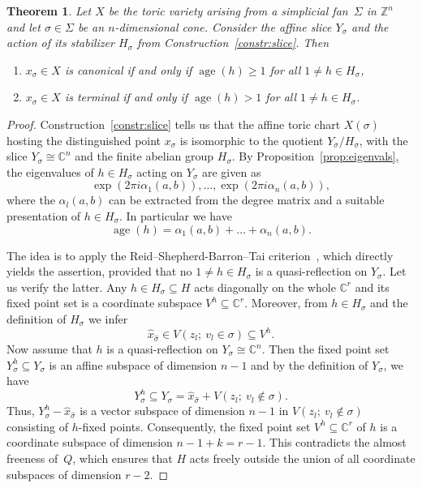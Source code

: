 \documentclass{amsart}
\newcommand{\C}{\mathbb{C}}
\newcommand{\Z}{\mathbb{Z}}
\DeclareMathOperator{\age}{age}
\theoremstyle{plain}
\newtheorem{theorem}{Theorem}[section]
\theoremstyle{definition}
\begin{document}
\begin{theorem}\label{thm:main}
Let $X$ be the toric variety arising from a simplicial fan~$\Sigma$
in $\Z^n$ and let $\sigma \in \Sigma$ be an $n$-dimensional cone.
Consider the affine slice $Y_\sigma$ and the action of its stabilizer
$H_\sigma$ from Construction~\ref{constr:slice}. Then
\begin{enumerate}
\item
$x_\sigma \in X$ is canonical if and only if $\age(h) \ge 1$ for all $1 \ne h \in H_\sigma$,
\item
$x_\sigma \in X$ is terminal if and only if $\age(h) > 1$ for all $1 \ne h \in H_\sigma$.
\end{enumerate}
\end{theorem}

\begin{proof}
Construction~\ref{constr:slice} tells us that the affine toric
chart $X(\sigma)$ hosting the distinguished point $x_\sigma$
is isomorphic to the quotient $Y_\sigma/H_\sigma$, with the slice
$Y_\sigma \cong \C^n$ and the finite abelian group $H_\sigma$.
By Proposition~\ref{prop:eigenvals}, the eigenvalues of $h \in H_\sigma$
acting on $Y_\sigma$ are given as
\[
\exp(2\pi i\alpha_1(a,b)),\dots,\exp(2\pi i\alpha_n(a,b)),
\]
where the $\alpha_l(a,b)$ can be extracted from the degree matrix
and a suitable presentation of $h \in H_\sigma$.
In particular we have
$$
\age(h)=\alpha_1(a,b)+\dots+\alpha_n(a,b).
$$

The idea is to apply the Reid--Shepherd-Barron--Tai criterion~\cite{MS84},
which directly yields the assertion, provided that no
$1\neq h \in H_\sigma$ is a quasi-reflection on $Y_\sigma$.
Let us verify the latter.
Any $h \in H_\sigma \subseteq H$ acts diagonally on the whole
$\C^r$ and its fixed point set is a coordinate subspace $V^h \subseteq \C^r$.
Moreover, from $h \in H_\sigma$ and the definition of $H_\sigma$
we infer
$$
\hat x_{\hat\sigma} \in V(z_l; \ v_l \in \sigma) \subseteq V^h.
$$
Now assume that $h$ is a quasi-reflection on $Y_\sigma \cong \C^n$.
Then the fixed point set $Y_\sigma^h \subseteq Y_\sigma$
is an affine subspace of dimension $n-1$ and by the
definition of $Y_\sigma$, we have
$$
Y_\sigma^h \subseteq Y_\sigma = \hat x_{\hat\sigma} + V(z_l; \ v_l \not\in \sigma).
$$
Thus, $Y_\sigma^h - \hat x_{\hat\sigma}$ is a vector subspace
of dimension $n-1$ in $V(z_l; \ v_l \not\in \sigma)$ consisting
of $h$-fixed points.
Consequently, the fixed point set $V^h \subseteq \C^r$ of $h$ is
a coordinate subspace of dimension $n-1 + k = r-1$.
This contradicts the almost freeness of~$Q$, which ensures
that $H$ acts freely outside the union of all
coordinate subspaces of dimension $r-2$.
\end{proof}
\end{document}
